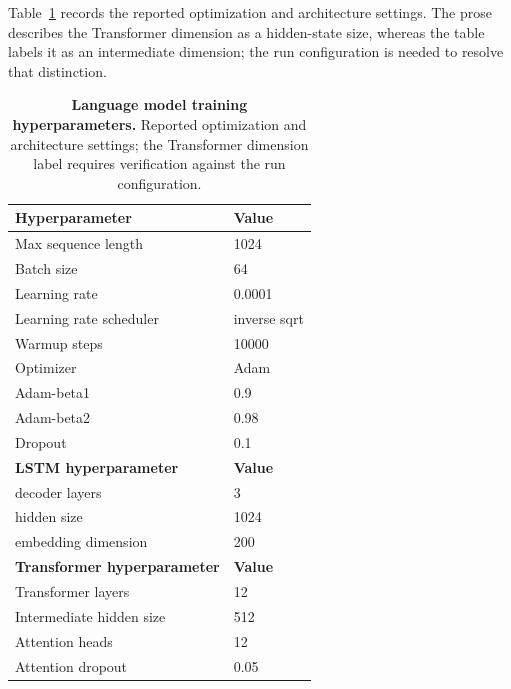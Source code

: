 Table~\ref{tab:model} records the reported optimization and architecture settings. The prose describes the Transformer dimension as a hidden-state size, whereas the table labels it as an intermediate dimension; the run configuration is needed to resolve that distinction.


\begin{table}[ht]
\centering
\begin{tabular}{@{} l l @{}}
\hline
\textbf{Hyperparameter} & \textbf{Value} \\
\hline
Max sequence length & 1024 \\
Batch size & 64 \\
Learning rate & 0.0001 \\
Learning rate scheduler & inverse sqrt \\
Warmup steps & 10000 \\
Optimizer & Adam \\
Adam-beta1 & 0.9 \\
Adam-beta2 & 0.98 \\
Dropout & 0.1 \\
\hline
\textbf{LSTM hyperparameter} & \textbf{Value} \\
\hline
decoder layers & 3 \\
hidden size & 1024 \\
embedding dimension & 200 \\
\hline
\textbf{Transformer hyperparameter} & \textbf{Value} \\
\hline
Transformer layers & 12 \\
Intermediate hidden size & 512 \\
Attention heads & 12 \\
Attention dropout & 0.05 \\
\hline
\end{tabular}
\caption{\textbf{Language model training hyperparameters.} Reported optimization and architecture settings; the Transformer dimension label requires verification against the run configuration.}
\label{tab:model}
\end{table}


